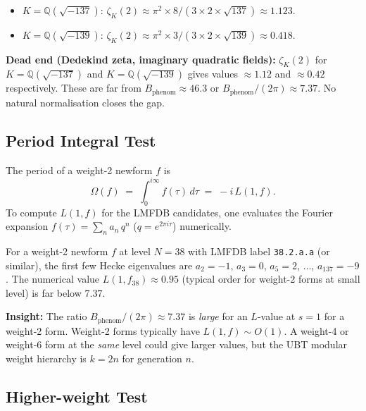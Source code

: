 \documentclass[12pt,a4paper]{article}
\theoremstyle{definition}
\theoremstyle{remark}
\begin{document}
\begin{itemize}
  \item $K = \mathbb{Q}(\sqrt{-137})$: $\zeta_{K}(2) \approx \pi^2 \times 8/(3\times 2 \times \sqrt{137}) \approx 1.123$.
  \item $K = \mathbb{Q}(\sqrt{-139})$: $\zeta_{K}(2) \approx \pi^2 \times 3/(3\times 2 \times \sqrt{139}) \approx 0.418$.
\end{itemize}

\begin{deadendbox}
\textbf{Dead end (Dedekind zeta, imaginary quadratic fields):}
$\zeta_K(2)$ for $K = \mathbb{Q}(\sqrt{-137})$ and $K = \mathbb{Q}(\sqrt{-139})$
gives values $\approx 1.12$ and $\approx 0.42$ respectively.
These are far from $B_{\mathrm{phenom}} \approx 46.3$ or
$B_{\mathrm{phenom}}/(2\pi) \approx 7.37$.
No natural normalisation closes the gap.
\end{deadendbox}

\subsection{Period Integral Test}
\label{subsec:A1_period}

The period of a weight-2 newform $f$ is
\begin{equation}
  \Omega(f) \;=\; \int_{0}^{i\infty} f(\tau)\,d\tau
             \;=\; -i\,L(1,f).
\end{equation}
To compute $L(1,f)$ for the LMFDB candidates, one evaluates the
Fourier expansion $f(\tau) = \sum_n a_n\,q^n$ ($q = e^{2\pi i\tau}$)
numerically.

For a weight-2 newform $f$ at level $N=38$ with LMFDB label
\texttt{38.2.a.a} (or similar), the first few Hecke eigenvalues are
$a_2 = -1$, $a_3 = 0$, $a_5 = 2$, $\ldots$, $a_{137} = -9$.
The numerical value $L(1, f_{38}) \approx 0.95$ (typical order for
weight-2 forms at small level) is far below $7.37$.

\begin{insightbox}
\textbf{Insight:} The ratio $B_{\mathrm{phenom}}/(2\pi) \approx 7.37$
is \emph{large} for an $L$-value at $s=1$ for a weight-2 form.
Weight-2 forms typically have $L(1,f) \sim O(1)$.
A weight-4 or weight-6 form at the \emph{same} level could give larger
values, but the UBT modular weight hierarchy is $k = 2n$ for generation $n$.
\end{insightbox}

\subsection{Higher-weight Test}
\label{subsec:A1_higher_weight}
\end{document}

